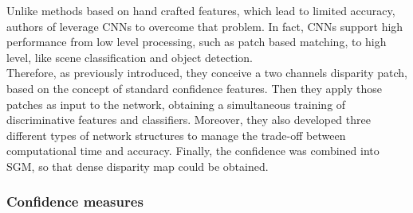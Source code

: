 Unlike methods based on hand crafted features, which lead to limited accuracy, authors of \cite{Seki2016} leverage CNNs to overcome that problem. 
In fact, CNNs support high performance from low level processing, such as patch based matching, to high level, like scene classification and object detection. \\
Therefore, as previously introduced, they conceive a two channels disparity patch, based on the concept of standard confidence features.
Then they apply those patches as input to the network, obtaining a simultaneous training of discriminative features and classifiers.
Moreover, they also developed three different types of network structures to manage the trade-off between computational time and accuracy. 
Finally, the confidence was combined into SGM, so that dense disparity map could be obtained. \\

\subsubsection{Confidence measures}

